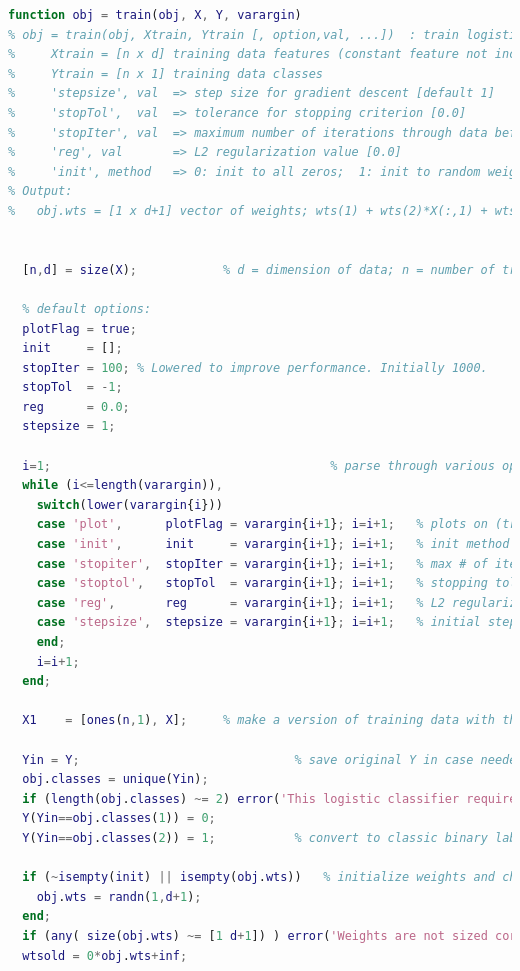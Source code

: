 \documentclass[]{report}   %
\begin{document}
\begin{lstlisting}[language=Matlab, caption=Full train.m implementation.]
function obj = train(obj, X, Y, varargin)
% obj = train(obj, Xtrain, Ytrain [, option,val, ...])  : train logistic classifier
%     Xtrain = [n x d] training data features (constant feature not included)
%     Ytrain = [n x 1] training data classes 
%     'stepsize', val  => step size for gradient descent [default 1]
%     'stopTol',  val  => tolerance for stopping criterion [0.0]
%     'stopIter', val  => maximum number of iterations through data before stopping [1000]
%     'reg', val       => L2 regularization value [0.0]
%     'init', method   => 0: init to all zeros;  1: init to random weights;  
% Output:
%   obj.wts = [1 x d+1] vector of weights; wts(1) + wts(2)*X(:,1) + wts(3)*X(:,2) + ...


  [n,d] = size(X);            % d = dimension of data; n = number of training data

  % default options:
  plotFlag = true; 
  init     = []; 
  stopIter = 100; % Lowered to improve performance. Initially 1000.
  stopTol  = -1;
  reg      = 0.0;
  stepsize = 1;

  i=1;                                       % parse through various options
  while (i<=length(varargin)),
    switch(lower(varargin{i}))
    case 'plot',      plotFlag = varargin{i+1}; i=i+1;   % plots on (true/false)
    case 'init',      init     = varargin{i+1}; i=i+1;   % init method
    case 'stopiter',  stopIter = varargin{i+1}; i=i+1;   % max # of iterations
    case 'stoptol',   stopTol  = varargin{i+1}; i=i+1;   % stopping tolerance on surrogate loss
    case 'reg',       reg      = varargin{i+1}; i=i+1;   % L2 regularization
    case 'stepsize',  stepsize = varargin{i+1}; i=i+1;   % initial stepsize
    end;
    i=i+1;
  end;

  X1    = [ones(n,1), X];     % make a version of training data with the constant feature

  Yin = Y;                              % save original Y in case needed later
  obj.classes = unique(Yin);
  if (length(obj.classes) ~= 2) error('This logistic classifier requires a binary classification problem.'); end;
  Y(Yin==obj.classes(1)) = 0;
  Y(Yin==obj.classes(2)) = 1;           % convert to classic binary labels (0/1)

  if (~isempty(init) || isempty(obj.wts))   % initialize weights and check for correct size
    obj.wts = randn(1,d+1);
  end;
  if (any( size(obj.wts) ~= [1 d+1]) ) error('Weights are not sized correctly for these data'); end;
  wtsold = 0*obj.wts+inf;


\end{lstlisting}
\end{document}
